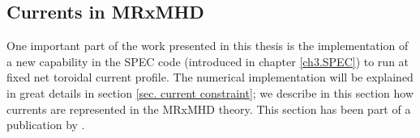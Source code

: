 \documentclass[my_thesis.tex]{subfiles}
\begin{document}


\subsection{Currents in MRxMHD}
One important part of the work presented in this thesis is the implementation of a new capability in the SPEC code (introduced in chapter \ref{ch3.SPEC}) to run at fixed net toroidal current profile. The numerical implementation will be explained in great details in section \ref{sec. current constraint}; we describe in this section how currents are represented in the MRxMHD theory. This section has been part of a publication by \citet{Baillod2021}.
\end{document}
